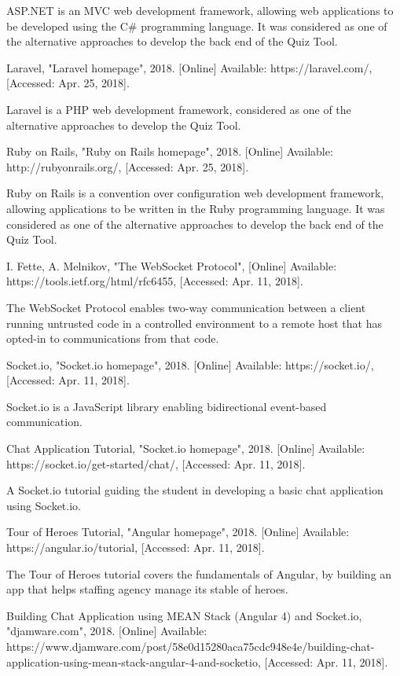 \documentclass[11pt,a4paper]{report}
\begin{document}
\begin{thebibliography}{1}
    ASP.NET is an MVC web development framework, allowing web applications to be developed using the C\# programming language.
    It was considered as one of the alternative approaches to develop the back end of the Quiz Tool.

 Laravel, "Laravel homepage", 2018. [Online] Available: https://laravel.com/, [Accessed: Apr. 25, 2018].

    Laravel is a PHP web development framework, considered as one of the alternative approaches to develop the Quiz Tool.

 Ruby on Rails, "Ruby on Rails homepage", 2018. [Online] Available: http://rubyonrails.org/, [Accessed: Apr. 25, 2018].

    Ruby on Rails is a convention over configuration web development framework, allowing applications to be written in the Ruby programming
    language. It was considered as one of the alternative approaches to develop the back end of the Quiz Tool.

 I. Fette, A. Melnikov, "The WebSocket Protocol", [Online] Available: https://tools.ietf.org/html/rfc6455, [Accessed: Apr. 11, 2018].

  The WebSocket Protocol enables two-way communication between a client running untrusted code in a controlled environment to a remote host
  that has opted-in to communications from that code.

 Socket.io, "Socket.io homepage", 2018. [Online] Available: https://socket.io/, [Accessed: Apr. 11, 2018].

  Socket.io is a JavaScript library enabling bidirectional event-based communication.

 Chat Application Tutorial, "Socket.io homepage", 2018. [Online] Available: https://socket.io/get-started/chat/, [Accessed: Apr. 11, 2018].

  A Socket.io tutorial guiding the student in developing a basic chat application using Socket.io.

 Tour of Heroes Tutorial, "Angular homepage", 2018. [Online] Available: https://angular.io/tutorial, [Accessed: Apr. 11, 2018].

  The Tour of Heroes tutorial covers the fundamentals of Angular, by building an app that helps staffing agency manage its stable of heroes.

 Building Chat Application using MEAN Stack (Angular 4) and Socket.io, "djamware.com", 2018.
  [Online] Available: https://www.djamware.com/post/58e0d15280aca75cdc948e4e/building-chat-application-using-mean-stack-angular-4-and-socketio,
  [Accessed: Apr. 11, 2018].


\end{thebibliography}
\end{document}
